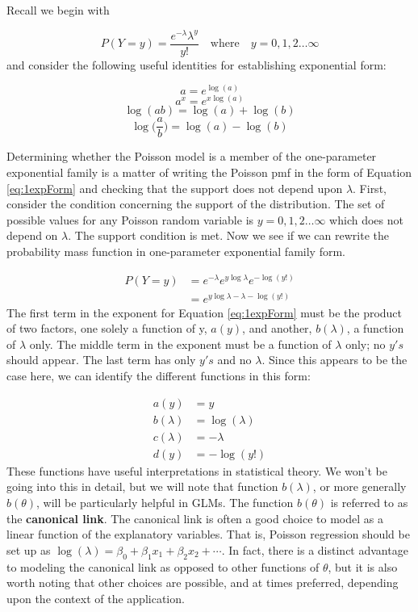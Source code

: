 \documentclass[
]{krantz}
\begin{document}
Recall we begin with

\[
P(Y=y)=\frac{e^{-\lambda}{\lambda}^y}{y!}\quad \textrm{where}\quad y=0,1,2\ldots\infty
\]
and consider the following useful identities for establishing exponential form:

\[a=e^{\log(a)} \]
\[a^x = e^{x\log(a)}\]
\[\log(ab)=\log(a)+\log(b)\]
\[\log\Big(\frac{a}{b}\Big)=\log(a)-\log(b)\]

Determining whether the Poisson model is a member of the one-parameter exponential family is a matter of writing the Poisson pmf in the form of Equation \eqref{eq:1expForm} and checking that the support does not depend upon \(\lambda\). First, consider the condition concerning the support of the distribution. The set of possible values for any Poisson random variable is \(y=0,1,2\ldots\infty\) which does not depend on \(\lambda\). The support condition is met. Now we see if we can rewrite the probability mass function in one-parameter exponential family form.

\begin{align*}
 P(Y=y)&= {e^{-\lambda}e^{y\log \lambda}e^{-\log (y!)}} \nonumber \\
       &= e^{y\log \lambda-\lambda-\log (y!)}
 \end{align*}
The first term in the exponent for Equation \eqref{eq:1expForm} must be the product of two factors, one solely a function of y, \(a(y)\), and another, \(b(\lambda)\), a function of \(\lambda\) only. The middle term in the exponent must be a function of \(\lambda\) only; no \(y's\) should appear. The last term has only \(y's\) and no \(\lambda\). Since this appears to be the case here, we can identify the different functions in this form:

\begin{align*}
a(y)&=y \\
b(\lambda)&=\log(\lambda) \\
c(\lambda)&=-\lambda \\
d(y)&=-\log (y!)
\label{eq:diffunc}
\end{align*}
These functions have useful interpretations in statistical theory. We won't be going into this in detail, but we will note that function \(b(\lambda)\), or more generally \(b(\theta)\), will be particularly helpful in GLMs. The function \(b(\theta)\) is referred to as the \textbf{canonical link}.  The canonical link is often a good choice to model as a linear function of the explanatory variables. That is, Poisson regression should be set up as \(\log(\lambda)=\beta_0+\beta_1x_1+\beta_2x_2+\cdots\). In fact, there is a distinct advantage to modeling the canonical link as opposed to other functions of \(\theta\), but it is also worth noting that other choices are possible, and at times preferred, depending upon the context of the application.
\end{document}
